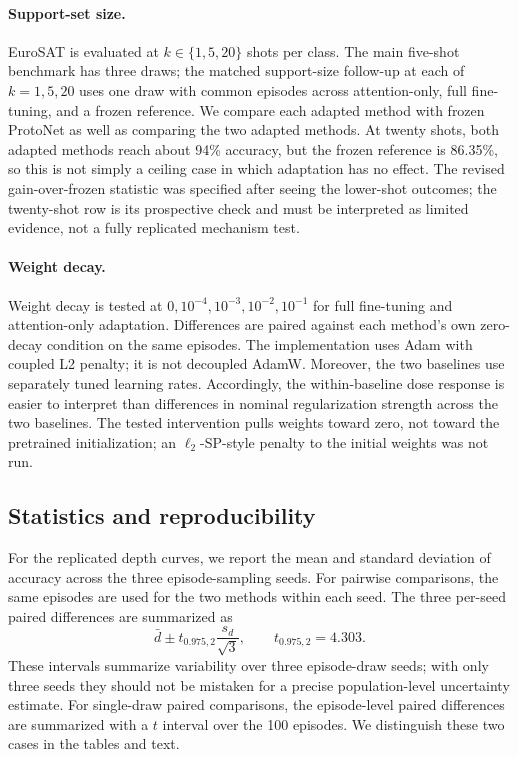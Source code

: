 \documentclass[11pt]{article}
\begin{document}
\paragraph{Support-set size.} EuroSAT is evaluated at $k\in\{1,5,20\}$ shots per class. The main five-shot benchmark has three draws; the matched support-size follow-up at each of $k=1,5,20$ uses one draw with common episodes across attention-only, full fine-tuning, and a frozen reference. We compare each adapted method with frozen ProtoNet as well as comparing the two adapted methods. At twenty shots, both adapted methods reach about 94\% accuracy, but the frozen reference is 86.35\%, so this is not simply a ceiling case in which adaptation has no effect. The revised gain-over-frozen statistic was specified after seeing the lower-shot outcomes; the twenty-shot row is its prospective check and must be interpreted as limited evidence, not a fully replicated mechanism test.

\paragraph{Weight decay.} Weight decay is tested at $0,10^{-4},10^{-3},10^{-2},10^{-1}$ for full fine-tuning and attention-only adaptation. Differences are paired against each method's own zero-decay condition on the same episodes. The implementation uses Adam with coupled L2 penalty; it is not decoupled AdamW. Moreover, the two baselines use separately tuned learning rates. Accordingly, the within-baseline dose response is easier to interpret than differences in nominal regularization strength across the two baselines. The tested intervention pulls weights toward zero, not toward the pretrained initialization; an $\ell_2$-SP-style penalty to the initial weights was not run.

\subsection{Statistics and reproducibility}

For the replicated depth curves, we report the mean and standard deviation of accuracy across the three episode-sampling seeds. For pairwise comparisons, the same episodes are used for the two methods within each seed. The three per-seed paired differences are summarized as
\begin{equation}
 \bar d \pm t_{0.975,2}\frac{s_d}{\sqrt{3}}, \qquad t_{0.975,2}=4.303.
 \label{eq:pairedci}
\end{equation}
These intervals summarize variability over three episode-draw seeds; with only three seeds they should not be mistaken for a precise population-level uncertainty estimate. For single-draw paired comparisons, the episode-level paired differences are summarized with a $t$ interval over the 100 episodes. We distinguish these two cases in the tables and text.
\end{document}
